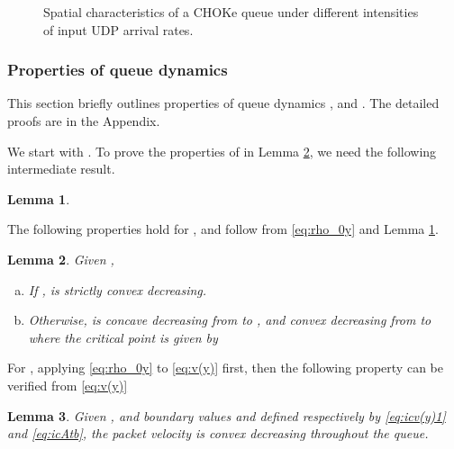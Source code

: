 \documentclass{IEEEtran}
\newtheorem{lemma}{Lemma}
\begin{document}
    \begin{figure*}
        \begin{minipage}[htb!]{0.98\linewidth}\centering
            \caption{Spatial characteristics of a CHOKe queue under different intensities of input UDP arrival rates.}
\label{fig:ss_CHOKEproperties}
        \end{minipage}
    \end{figure*}

    \subsubsection{Properties of queue dynamics}\label{subsub:sdmProperties}
This section briefly outlines properties of queue dynamics ,  and . The detailed proofs are in the Appendix.


We start with . To prove the properties of  in Lemma \ref{eq:lemmaRho_0Y}, we need the following intermediate result.
\begin{lemma}\label{lemma:intermediateR}
    
\end{lemma}

The following properties hold for , and follow from \eqref{eq:rho_0y} and Lemma \ref{lemma:intermediateR}.
    \begin{lemma}\label{eq:lemmaRho_0Y}
       Given , \begin{enumerate}[(a)]
             \item If ,  is strictly convex decreasing.
             \item Otherwise,  is concave decreasing from  to , and  convex decreasing from  to  where the critical point  is given by
                    
        \end{enumerate}
    \end{lemma}

For , applying \eqref{eq:rho_0y} to \eqref{eq:v(y)} first, then the following property can be verified from \eqref{eq:v(y)}
    \begin{lemma}\label{eq:lemmavY}
        Given , and boundary values  and  defined respectively by \eqref{eq:icv(y)1} and \eqref{eq:icAtb}, the packet velocity  is convex decreasing throughout the queue.
    \end{lemma}
\end{document}
